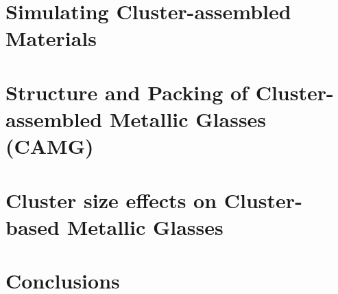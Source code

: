 \documentclass[
english,
ruledheaders=section,%
class=report,%
thesis={
	type=drfinal, dr=ing, department=matgeo},
accentcolor=9c,%
custommargins=true,%
marginpar=false,%
parskip=half-,%
fontsize=11pt,%
]{tudapub}
\begin{document}
\chapter{Simulating Cluster-assembled Materials} \label{c:dev}


\chapter{Structure and Packing of Cluster-assembled Metallic Glasses (CAMG)} \label{c:camg}


\chapter{Cluster size effects on Cluster-based Metallic Glasses} \label{c:cbmg}


\chapter{Conclusions}











\printbibliography
\end{document}
